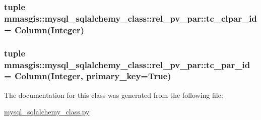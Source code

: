\label{classmmasgis_1_1mysql__sqlalchemy__class_1_1rel__pv__par_aa2ac354763197d11a1b597f4907e142f}
\hypertarget{classmmasgis_1_1mysql__sqlalchemy__class_1_1rel__pv__par_ae516341edcd41cc2a115cb9150c9745b}{
\subsubsection[{tc\_\-clpar\_\-id}]{\setlength{\rightskip}{0pt plus 5cm}tuple {\bf mmasgis::mysql\_\-sqlalchemy\_\-class::rel\_\-pv\_\-par::tc\_\-clpar\_\-id} = Column(Integer)}}
\label{classmmasgis_1_1mysql__sqlalchemy__class_1_1rel__pv__par_ae516341edcd41cc2a115cb9150c9745b}
\hypertarget{classmmasgis_1_1mysql__sqlalchemy__class_1_1rel__pv__par_a3be65bd9edd35a188477630e176fac47}{
\subsubsection[{tc\_\-par\_\-id}]{\setlength{\rightskip}{0pt plus 5cm}tuple {\bf mmasgis::mysql\_\-sqlalchemy\_\-class::rel\_\-pv\_\-par::tc\_\-par\_\-id} = Column(Integer, primary\_\-key=True)}}
\label{classmmasgis_1_1mysql__sqlalchemy__class_1_1rel__pv__par_a3be65bd9edd35a188477630e176fac47}


The documentation for this class was generated from the following file:\begin{DoxyCompactItemize}
\item 
\hyperlink{mysql__sqlalchemy__class_8py}{mysql\_\-sqlalchemy\_\-class.py}\end{DoxyCompactItemize}
